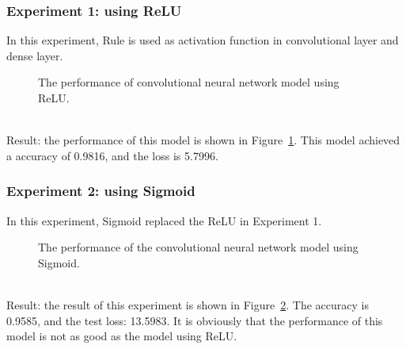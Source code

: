 \documentclass[]{UCD_CS_FYP_Report}
\begin{document}
\subsubsection{Experiment 1: using ReLU}
In this experiment, Rule is used as activation function in convolutional layer and dense layer.
\begin{figure}[h]
\centering
\fboxsep 2mm
\caption{\label{fig:MNIST_CNN_S1E1} The performance of convolutional neural network model using ReLU.}
\end{figure}
\\Result: the performance of this model is shown in Figure~\ref{fig:MNIST_CNN_S1E1}. This model achieved a accuracy of 0.9816, and the loss is 5.7996.
%
\subsubsection{Experiment 2: using Sigmoid}
In this experiment, Sigmoid replaced the ReLU in Experiment 1.
\begin{figure}[h]
\centering
\fboxsep 2mm
\caption{\label{fig:MNIST_CNN_S1E2} The performance of the convolutional neural network model using Sigmoid.}
\end{figure}
\\Result: the result of this experiment is shown in Figure~\ref{fig:MNIST_CNN_S1E2}. The accuracy is 0.9585, and the test loss: 13.5983. It is obviously that the performance of this model is not as good as the model using ReLU. 
%
\end{document}

